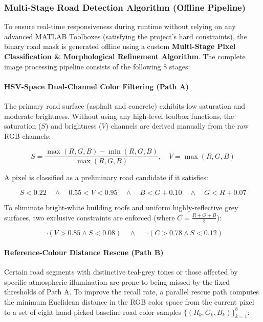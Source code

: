 \documentclass[12pt,a4paper]{ctexart}
\begin{document}
\subsubsection{Multi-Stage Road Detection Algorithm (Offline Pipeline)}

To ensure real-time responsiveness during runtime without relying on any advanced MATLAB Toolboxes (satisfying the project's hard constraints), the binary road mask is generated offline using a custom \textbf{Multi-Stage Pixel Classification \& Morphological Refinement Algorithm}. The complete image processing pipeline consists of the following 8 stages:

\paragraph{HSV-Space Dual-Channel Color Filtering (Path A)}

The primary road surface (asphalt and concrete) exhibits low saturation and moderate brightness. Without using any high-level toolbox functions, the saturation ($S$) and brightness ($V$) channels are derived manually from the raw RGB channels:

\[
S = \frac{\max(R,G,B) - \min(R,G,B)}{\max(R,G,B)}, \quad V = \max(R,G,B)
\]

A pixel is classified as a preliminary road candidate if it satisfies:

\[
S < 0.22 \quad \land \quad 0.55 < V < 0.95 \quad \land \quad B < G + 0.10 \quad \land \quad G < R + 0.07
\]

To eliminate bright-white building roofs and uniform highly-reflective grey surfaces, two exclusive constraints are enforced (where $C = \frac{R+G+B}{3}$):

\[
\neg (V > 0.85 \land S < 0.08) \quad \land \quad \neg (C > 0.78 \land S < 0.12)
\]

\paragraph{Reference-Colour Distance Rescue (Path B)}

Certain road segments with distinctive teal-grey tones or those affected by specific atmospheric illumination are prone to being missed by the fixed thresholds of Path A. To improve the recall rate, a parallel rescue path computes the minimum Euclidean distance in the RGB color space from the current pixel to a set of eight hand-picked baseline road color samples $\{(R_k, G_k, B_k)\}_{k=1}^8$:
\end{document}

